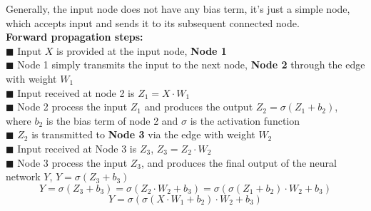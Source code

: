\documentclass[12pt,a4paper,bold]{thesis}
\theoremstyle{thm}
\theoremstyle{definition}
\begin{document}
\indent Generally, the input node does not have any bias term, it's just a simple node, which accepts input and sends it to its subsequent connected node.\\ 
\textbf{Forward propagation steps:}\\
$\blacksquare$ Input $X$ is provided at the input node, \textbf{Node 1}\\
$\blacksquare$ Node 1 simply transmits the input to the next node, \textbf{Node 2} through the edge with weight $W_1$\\
$\blacksquare$ Input received at node 2 is $Z_1 = X\cdot W_1$\\
$\blacksquare$ Node 2 process the input $Z_1$ and produces the output $Z_2=\sigma(Z_1+b_2)$, where $b_2$ is the bias term of node 2 and $\sigma$ is the activation function\\
$\blacksquare$ $Z_2$ is transmitted to \textbf{Node 3} via the edge with weight $W_2$\\
$\blacksquare$ Input received at Node 3 is $Z_3$, $Z_3=Z_2 \cdot W_2$\\
$\blacksquare$ Node 3 process the input $Z_3$, and produces the final output of the neural network $Y$, $Y=\sigma(Z_3 + b_3)$\\
\[Y=\sigma(Z_3 + b_3)=\sigma(Z_2 \cdot W_2 + b_3)=\sigma(\sigma(Z_1+b_2) \cdot W_2 + b_3)\]
\[Y=\sigma(\sigma(X\cdot W_1+b_2) \cdot W_2 + b_3)\]
\end{document}
